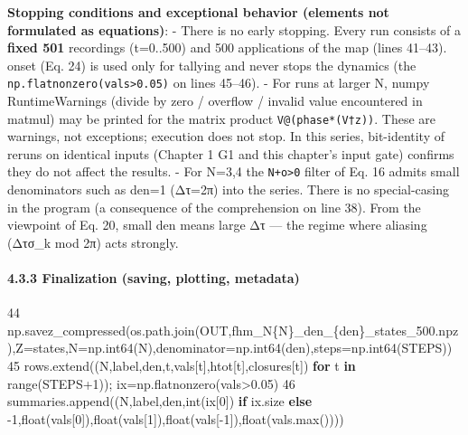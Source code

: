 \documentclass[
  a4paper,
]{ltjsarticle}
\newenvironment{Shaded}{}{}
\newcommand{\BuiltInTok}[1]{\textcolor[rgb]{0.00,0.50,0.00}{#1}}
\newcommand{\ControlFlowTok}[1]{\textcolor[rgb]{0.00,0.44,0.13}{\textbf{#1}}}
\newcommand{\DecValTok}[1]{\textcolor[rgb]{0.25,0.63,0.44}{#1}}
\newcommand{\FloatTok}[1]{\textcolor[rgb]{0.25,0.63,0.44}{#1}}
\newcommand{\KeywordTok}[1]{\textcolor[rgb]{0.00,0.44,0.13}{\textbf{#1}}}
\newcommand{\NormalTok}[1]{#1}
\newcommand{\OperatorTok}[1]{\textcolor[rgb]{0.40,0.40,0.40}{#1}}
\newcommand{\SpecialCharTok}[1]{\textcolor[rgb]{0.25,0.44,0.63}{#1}}
\newcommand{\SpecialStringTok}[1]{\textcolor[rgb]{0.73,0.40,0.53}{#1}}
\begin{document}
\textbf{Stopping conditions and exceptional behavior (elements not
formulated as equations)}: - There is no early stopping. Every run
consists of a \textbf{fixed 501} recordings (t=0..500) and 500
applications of the map (lines 41--43). onset (Eq. 24) is used only for
tallying and never stops the dynamics (the
\texttt{np.flatnonzero(vals\textgreater{}0.05)} on lines 45--46). - For
runs at larger N, numpy RuntimeWarnings (divide by zero / overflow /
invalid value encountered in matmul) may be printed for the matrix
product \texttt{V@(phase*(V†z))}. These are warnings, not exceptions;
execution does not stop. In this series, bit-identity of reruns on
identical inputs (Chapter 1 G1 and this chapter's input gate) confirms
they do not affect the results. - For N=3,4 the
\texttt{N+o\textgreater{}0} filter of Eq. 16 admits small denominators
such as den=1 (Δτ=2π) into the series. There is no special-casing in the
program (a consequence of the comprehension on line 38). From the
viewpoint of Eq. 20, small den means large Δτ --- the regime where
aliasing (Δτσ\_k mod 2π) acts strongly.

\paragraph{4.3.3 Finalization (saving, plotting,
metadata)}\label{finalization-saving-plotting-metadata}

\begin{Shaded}
\begin{Highlighting}[]
    \DecValTok{44}\NormalTok{          np.savez\_compressed(os.path.join(OUT,}\SpecialStringTok{f\textquotesingle{}hm\_N}\SpecialCharTok{\{}\NormalTok{N}\SpecialCharTok{\}}\SpecialStringTok{\_den\_}\SpecialCharTok{\{}\NormalTok{den}\SpecialCharTok{\}}\SpecialStringTok{\_states\_500.npz\textquotesingle{}}\NormalTok{),Z}\OperatorTok{=}\NormalTok{states,N}\OperatorTok{=}\NormalTok{np.int64(N),denominator}\OperatorTok{=}\NormalTok{np.int64(den),steps}\OperatorTok{=}\NormalTok{np.int64(STEPS))}
    \DecValTok{45}\NormalTok{          rows.extend((N,label,den,t,vals[t],htot[t],closures[t]) }\ControlFlowTok{for}\NormalTok{ t }\KeywordTok{in} \BuiltInTok{range}\NormalTok{(STEPS}\OperatorTok{+}\DecValTok{1}\NormalTok{))}\OperatorTok{;}\NormalTok{ ix}\OperatorTok{=}\NormalTok{np.flatnonzero(vals}\OperatorTok{\textgreater{}}\FloatTok{0.05}\NormalTok{)}
    \DecValTok{46}\NormalTok{          summaries.append((N,label,den,}\BuiltInTok{int}\NormalTok{(ix[}\DecValTok{0}\NormalTok{]) }\ControlFlowTok{if}\NormalTok{ ix.size }\ControlFlowTok{else} \OperatorTok{{-}}\DecValTok{1}\NormalTok{,}\BuiltInTok{float}\NormalTok{(vals[}\DecValTok{0}\NormalTok{]),}\BuiltInTok{float}\NormalTok{(vals[}\DecValTok{1}\NormalTok{]),}\BuiltInTok{float}\NormalTok{(vals[}\OperatorTok{{-}}\DecValTok{1}\NormalTok{]),}\BuiltInTok{float}\NormalTok{(vals.}\BuiltInTok{max}\NormalTok{())))}
\end{Highlighting}
\end{Shaded}
\end{document}
